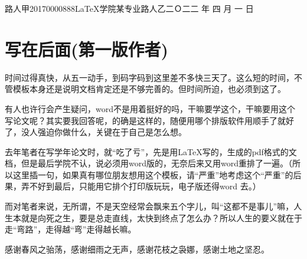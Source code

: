 \documentclass[a4paper]{nuist}
\begin{document}
{路人甲}{20170000888}{\LaTeX 学院}{某专业}{路人乙}{二Ｏ二二\hspace{0.4em} 年\hspace{0.4em} 四\hspace{0.4em} 月\hspace{0.4em} 一\hspace{0.4em} 日}










\section{写在后面(第一版作者)}

时间过得真快，从五一动手，到码字码到这里差不多快三天了。这么短的时间，不管模板本身还是说明文档肯定还是不够完善的。但时间所迫，也必须到这了。

有人也许行会产生疑问，word不是用着挺好的吗，干嘛要学这个，干嘛要用这个写论文呢？其实要我回答呢，的确是这样的，随便用哪个排版软件用顺手了就好了，没人强迫你做什么，关键在于自己是怎么想。

去年笔者在写学年论文时，就“吃了亏”，先是用\LaTeX 写的，生成的pdf格式的文档，但是最后学院不认，说必须用word版的，无奈后来又用word重排了一遍。（所以这里插一句，如果真有哪位朋友想用这个模板，请“严重”地考虑这个“严重”的后果，弄不好到最后，只能用它排个打印版玩玩，电子版还得word 去。）

而对笔者来说，无所谓，不是天空经常会飘来五个字儿，叫“这都不是事儿”嘛，人生本就是向死之生，要是总走直线，太快到终点了怎么办？所以人生的要义就在于走“弯路”，走得越“弯”走得越长嘛。









\thanking
{
    感谢春风之骀荡，感谢细雨之无声，感谢花枝之袅娜，感谢土地之坚忍。

    \vspace{5em}
    {\color{red}
    }
}
\end{document}
